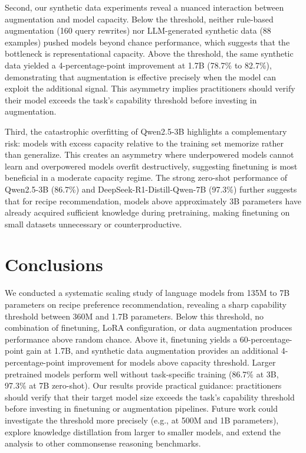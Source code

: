 \documentclass{article}
\begin{document}
Second, our synthetic data experiments reveal a nuanced interaction between augmentation and model capacity. Below the threshold, neither rule-based augmentation (160 query rewrites) nor LLM-generated synthetic data (88 examples) pushed models beyond chance performance, which suggests that the bottleneck is representational capacity. Above the threshold, the same synthetic data yielded a 4-percentage-point improvement at 1.7B (78.7\% to 82.7\%), demonstrating that augmentation is effective precisely when the model can exploit the additional signal. This asymmetry implies practitioners should verify their model exceeds the task's capability threshold before investing in augmentation.

Third, the catastrophic overfitting of Qwen2.5-3B highlights a complementary risk: models with excess capacity relative to the training set memorize rather than generalize. This creates an asymmetry where underpowered models cannot learn and overpowered models overfit destructively, suggesting finetuning is most beneficial in a moderate capacity regime. The strong zero-shot performance of Qwen2.5-3B (86.7\%) and DeepSeek-R1-Distill-Qwen-7B (97.3\%) further suggests that for recipe recommendation, models above approximately 3B parameters have already acquired sufficient knowledge during pretraining, making finetuning on small datasets unnecessary or counterproductive.

\section{Conclusions}

We conducted a systematic scaling study of language models from 135M to 7B parameters on recipe preference recommendation, revealing a sharp capability threshold between 360M and 1.7B parameters. Below this threshold, no combination of finetuning, LoRA configuration, or data augmentation produces performance above random chance. Above it, finetuning yields a 60-percentage-point gain at 1.7B, and synthetic data augmentation provides an additional 4-percentage-point improvement for models above capacity threshold. Larger pretrained models perform well without task-specific training (86.7\% at 3B, 97.3\% at 7B zero-shot). Our results provide practical guidance: practitioners should verify that their target model size exceeds the task's capability threshold before investing in finetuning or augmentation pipelines. Future work could investigate the threshold more precisely (e.g., at 500M and 1B parameters), explore knowledge distillation from larger to smaller models, and extend the analysis to other commonsense reasoning benchmarks.
\end{document}
